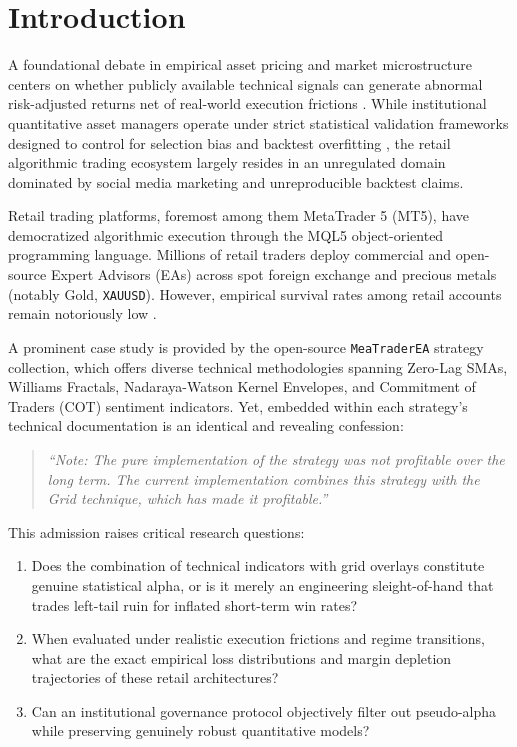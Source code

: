 \documentclass[11pt,a4paper]{article}
\begin{document}
\section{Introduction}
A foundational debate in empirical asset pricing and market microstructure centers on whether publicly available technical signals can generate abnormal risk-adjusted returns net of real-world execution frictions \cite{fama1970efficient, lo1988stock, jegadeesh1993returns, carhart1997persistence}. While institutional quantitative asset managers operate under strict statistical validation frameworks designed to control for selection bias and backtest overfitting \cite{bailey2014deflated, harvey2016and, lopez2018advances}, the retail algorithmic trading ecosystem largely resides in an unregulated domain dominated by social media marketing and unreproducible backtest claims.

Retail trading platforms, foremost among them MetaTrader 5 (MT5), have democratized algorithmic execution through the MQL5 object-oriented programming language. Millions of retail traders deploy commercial and open-source Expert Advisors (EAs) across spot foreign exchange and precious metals (notably Gold, \texttt{XAUUSD}). However, empirical survival rates among retail accounts remain notoriously low \cite{bouchaud2003theory}. 

A prominent case study is provided by the open-source \texttt{MeaTraderEA} strategy collection, which offers diverse technical methodologies spanning Zero-Lag SMAs, Williams Fractals, Nadaraya-Watson Kernel Envelopes, and Commitment of Traders (COT) sentiment indicators. Yet, embedded within each strategy's technical documentation is an identical and revealing confession:
\begin{quote}
\textit{``Note: The pure implementation of the strategy was not profitable over the long term. The current implementation combines this strategy with the Grid technique, which has made it profitable.''}
\end{quote}

This admission raises critical research questions:
\begin{enumerate}
    \item Does the combination of technical indicators with grid overlays constitute genuine statistical alpha, or is it merely an engineering sleight-of-hand that trades left-tail ruin for inflated short-term win rates?
    \item When evaluated under realistic execution frictions and regime transitions, what are the exact empirical loss distributions and margin depletion trajectories of these retail architectures?
    \item Can an institutional governance protocol objectively filter out pseudo-alpha while preserving genuinely robust quantitative models?
\end{enumerate}
\end{document}
